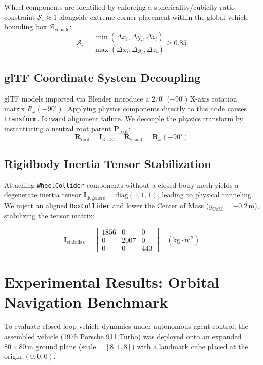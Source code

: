 \documentclass[11pt,a4paper]{article}
\begin{document}
Wheel components are identified by enforcing a sphericality/cubicity ratio constraint $\mathcal{S}_i \approx 1$ alongside extreme corner placement within the global vehicle bounding box $\mathcal{B}_{\text{vehicle}}$:
\begin{equation}
\mathcal{S}_i = \frac{\min(\Delta x_i, \Delta y_i, \Delta z_i)}{\max(\Delta x_i, \Delta y_i, \Delta z_i)} \ge 0.85
\end{equation}

\subsection{glTF Coordinate System Decoupling}
glTF models imported via Blender introduce a $270^\circ$ ($-90^\circ$) X-axis rotation matrix $R_x(-90^\circ)$. Applying physics components directly to this node causes \texttt{transform.forward} alignment failure. We decouple the physics transform by instantiating a neutral root parent $\mathbf{P}_{\text{root}}$:
\begin{equation}
\mathbf{R}_{\text{root}} = \mathbf{I}_{3 \times 3}, \quad \mathbf{R}_{\text{visual}} = \mathbf{R}_x(-90^\circ)
\end{equation}

\subsection{Rigidbody Inertia Tensor Stabilization}
Attaching \texttt{WheelCollider} components without a closed body mesh yields a degenerate inertia tensor $\mathbf{I}_{\text{degenere}} = \text{diag}(1, 1, 1)$, leading to physical tunneling. We inject an aligned \texttt{BoxCollider} and lower the Center of Mass ($y_{\text{CoM}} = -0.2\,\text{m}$), stabilizing the tensor matrix:

\begin{equation}
\mathbf{I}_{\text{stabilizz}} = \begin{bmatrix} 1856 & 0 & 0 \\ 0 & 2007 & 0 \\ 0 & 0 & 443 \end{bmatrix} \quad (\text{kg}\cdot\text{m}^2)
\end{equation}

\section{Experimental Results: Orbital Navigation Benchmark}

To evaluate closed-loop vehicle dynamics under autonomous agent control, the assembled vehicle (1975 Porsche 911 Turbo) was deployed onto an expanded $80 \times 80\,\text{m}$ ground plane ($\text{scale} = [8, 1, 8]$) with a landmark cube placed at the origin $(0,0,0)$.
\end{document}
